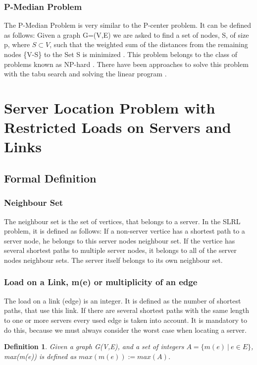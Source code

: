 \documentclass [12pt]{article}
\newtheorem{mydef}{Definition}
\begin{document}
\subsubsection {P-Median Problem}
The P-Median Problem is very similar to the P-center problem. It can be defined as follows:
Given a graph G=(V,E) we are asked to find a set of nodes, S, of size p, where $ S\subset V$, such that the weighted
sum of the distances from the remaining nodes \{V-S\} to the Set S is minimized \cite{Rolland1997329}.
This problem belongs to the class of problems known as NP-hard \cite{KarivHakimi1979median}. There have been
approaches to solve this problem with the tabu search \cite{Rolland1997329} and solving the linear program 
\cite{rosing1979p}.


\section{Server Location Problem with Restricted Loads on Servers and Links}
\subsection{Formal Definition}
\subsubsection{Neighbour Set}
The neighbour set is the set of vertices, that belongs to a server. In the SLRL problem, it is
defined as follows: If a non-server vertice has a shortest path to a server node, he 
belongs to this server nodes neighbour set. If the vertice has several shortest
paths to multiple server nodes, it belongs to all of the server nodes neighbour
sets. The server itself belongs to its own neighbour set.
\subsubsection{Load on a Link, m(e) or multiplicity of an edge}
The load on a link (edge) is an integer. It is defined as the number of shortest paths, that use this link. If there
are several shortest paths with the same length to one or more servers every
used edge is taken into account. It is mandatory to do this, because we must always consider
the worst case when locating a server. 
\begin{mydef}
  Given a graph G(V,E), and a set of integers $A= \{ m(e) \ | \ e \in E \}$, max(m(e)) is defined as $max(m(e)):= max(A)$.
\end{mydef}
\end{document}
